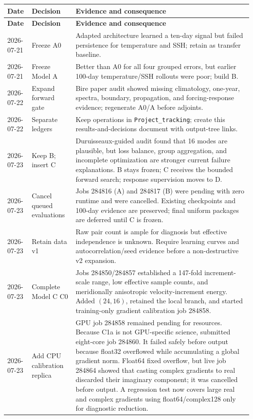 \documentclass[11pt]{article}
\begin{document}
\begin{longtable}{@{}p{}p{}p{}@{}}
\toprule
\textbf{Date} & \textbf{Decision} & \textbf{Evidence and consequence} \\
\midrule
\endfirsthead
\toprule
\textbf{Date} & \textbf{Decision} & \textbf{Evidence and consequence} \\
\midrule
\endhead
2026-07-21 & Freeze A0 & Adapted architecture learned a ten-day signal but failed persistence for temperature and SSH; retain as transfer baseline. \\
2026-07-21 & Freeze Model A & Better than A0 for all four grouped errors, but earlier 100-day temperature/SSH rollouts were poor; build B. \\
2026-07-22 & Expand forward gate & Bire paper audit showed missing climatology, one-year, spectra, boundary, propagation, and forcing-response evidence; regenerate A0/A before adjoints. \\
2026-07-22 & Separate ledgers & Keep operations in \texttt{Project\_tracking}; create this results-and-decisions document with output-tree links. \\
2026-07-23 & Keep B; insert C & Duruisseaux-guided audit found that 16 modes are plausible, but loss balance, group aggregation, and incomplete optimization are stronger current failure explanations.  B stays frozen; C receives the bounded forward search; response supervision moves to D. \\
2026-07-23 & Cancel queued evaluations & Jobs 284816 (A) and 284817 (B) were pending with zero runtime and were cancelled.  Existing checkpoints and 100-day evidence are preserved; final uniform packages are deferred until C is frozen. \\
2026-07-23 & Retain data v1 & Raw pair count is ample for diagnosis but effective independence is unknown.  Require learning curves and autocorrelation/seed evidence before a non-destructive v2 expansion. \\
2026-07-23 & Complete Model C C0 & Jobs 284850/284857 established a 147-fold increment-scale range, low effective sample counts, and meridionally anisotropic velocity-increment energy.  Added \((24,16)\), retained the local branch, and started training-only gradient calibration job 284858. \\
2026-07-23 & Add CPU calibration replica & GPU job 284858 remained pending for resources.  Because C1a is not GPU-specific science, submitted eight-core job 284860.  It failed safely before output because float32 overflowed while accumulating a global gradient norm.  Float64 fixed overflow, but live job 284864 showed that casting complex gradients to real discarded their imaginary component; it was cancelled before output.  A regression test now covers large real and complex gradients using float64/complex128 only for diagnostic reduction. \\

\end{longtable}
\end{document}
